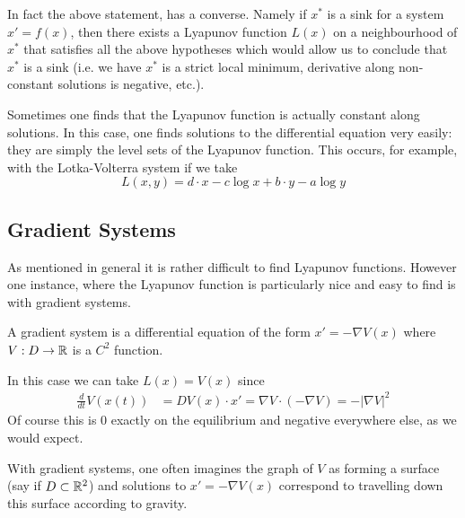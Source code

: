 In fact the above statement, has a converse. Namely if $x^*$ is a sink for a system $x' = f(x)$, then there exists a Lyapunov function $L(x)$ on a neighbourhood of $x^*$ that satisfies all the above hypotheses which would allow us to conclude that $x^*$ is a sink (i.e. we have $x^*$ is a strict local minimum, derivative along non-constant solutions is negative, etc.).

Sometimes one finds that the Lyapunov function is actually constant along solutions. In this case, one finds solutions to the differential equation very easily: they are simply the level sets of the Lyapunov function. This occurs, for example, with the Lotka-Volterra system if we take 
$$ L(x, y) = d \cdot x - c \log x + b \cdot y - a\log y $$

\subsection{Gradient Systems}
As mentioned in general it is rather difficult to find Lyapunov functions. However one instance, where the Lyapunov function is particularly nice and easy to find is with gradient systems. 

\begin{definition}
A gradient system is a differential equation of the form $x' = - \nabla V(x)$ where $V: D \to \mathbb{R}$ is a $C^2$ function.
\end{definition}
In this case we can take $L(x) = V(x)$ since
\begin{align*}
    \frac{d}{dt} V(x(t)) &= DV(x) \cdot x' = \nabla V \cdot (- \nabla V) = - |\nabla V|^2
\end{align*}
Of course this is 0 exactly on the equilibrium and negative everywhere else, as we would expect. 

With gradient systems, one often imagines the graph of $V$ as forming a surface (say if $D \subset \mathbb{R}^2$) and solutions to $x' = - \nabla V(x)$ correspond to travelling down this surface according to gravity.

